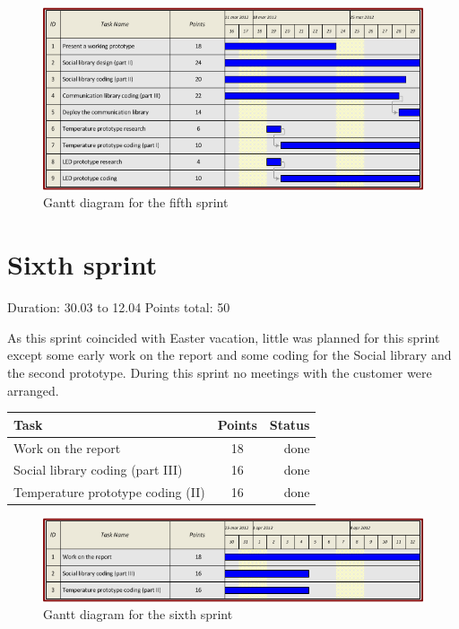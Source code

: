 \begin{figure}[h!]
\centering \includegraphics[scale=0.8]{img/sprints-gantt5.png}
\caption{Gantt diagram for the fifth sprint}
\label{fig:sprints-gantt5}
\end{figure}


\newpage

\section{Sixth sprint}

Duration: 30.03 to 12.04
Points total: 50

As this sprint coincided with Easter vacation, little
was planned for this sprint except some early work on the report
and some coding for the Social library and the second prototype.
During this sprint no meetings with the customer were arranged.

\begin{table}[ht!]
\begin{tabular}{ | l | c | r | }

\hline
\textbf{Task} & \textbf{Points} & \textbf{Status} \\
\hline

Work on the report					& 18 & done \\
\hline
Social library coding (part III)	& 16 & done \\
\hline
Temperature prototype coding (II)	& 16 & done \\
\hline

\end{tabular}
\end{table}

\begin{figure}[h!]
\centering \includegraphics[scale=0.8]{img/sprints-gantt6.png}
\caption{Gantt diagram for the sixth sprint}
\label{fig:sprints-gantt6}
\end{figure}

